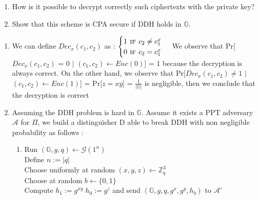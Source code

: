 \begin{enumerate}
	\item How is it possible to decrypt correctly such ciphertexts with the private key?
	\item Show that this scheme is CPA secure if DDH holds in $\mathbb{G}$. 
\end{enumerate}
\begin{solution}
\begin{enumerate}
    \item We can define $Dec_{x}(c_1, c_2)$ as : $\begin{cases}
    1 \textsc{ if } c_2 \neq c_1^x \\
    0 \textsc{ if } c_2 = c_1^x\\
\end{cases}$ \newline \newline
    We observe that Pr[$Dec_{x}(c_1, c_2)$ = 0 $|$ $(c_1, c_2) \leftarrow Enc(0)$] = 1 because the decryption is always correct. \newline \newline
    On the other hand, we observe that Pr[$ Dec_{x}(c_1, c_2) \neq 1$ $|$ $(c_1, c_2) \leftarrow Enc(1)$] = Pr[$ z = xy $] = $\frac{1}{|\mathbb{G}|}$ is negligible, then we conclude that the decryption is correct
    
    \item Assuming the DDH problem is hard in $\mathbb{G}$. \newline
    Assume it exists a PPT adversary $\mathcal{A}$ for $\Pi$, we build a distinguisher D able to break DDH with non negligible probability as follows :
    \begin{enumerate}
        \item Run $(\mathbb{G},g,q) \leftarrow \mathcal{G}(1^n)$\\
        Define $n:=|q|$\\
        Choose uniformly at random $(x,y,z) \leftarrow \mathbb{Z}^3_q$\\
        Choose at random $b\leftarrow\{0,1\}$\\
        Compute $h_1:=g^{xy}\;h_0:=g^z$ and send $(\mathbb{G},g,q,g^x,g^y,h_b)$ to $\mathcal{A}'$
        

\end{enumerate}
\end{enumerate}
\end{solution}
